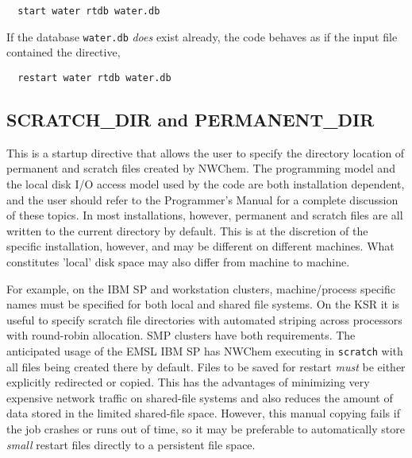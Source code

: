 \begin{verbatim}
  start water rtdb water.db
\end{verbatim}

If the database \verb+water.db+ {\it does} exist already,
the code behaves as if the input file contained the directive,

\begin{verbatim}
  restart water rtdb water.db
\end{verbatim}


\subsection{SCRATCH\_DIR and PERMANENT\_DIR}
\label{sec:dirs}


This is a startup directive that allows the user to specify the directory
location of permanent and scratch files created by NWChem.  The programming
model and the local disk I/O access model used by the code are both installation
dependent, and the user should refer to the Programmer's Manual for a
complete discussion of these topics.  
In most installations, however, permanent and scratch files are all 
written to the current directory by default.  This is at the discretion
of the specific installation, however, and may be different on different
machines.  What constitutes 'local' disk space may also differ from
machine to machine.


For example, on the IBM SP and workstation clusters, machine/process 
specific names 
must be specified for both local and shared file systems.
On the KSR it is useful to specify scratch file directories with
automated striping across processors with round-robin allocation.  SMP
clusters have both requirements.  The anticipated usage of the EMSL
IBM SP has NWChem executing in \verb+scratch+ with all files
being created there by default.  Files to be saved for restart 
{\em must} be either explicitly redirected or copied.  This has the
advantages of minimizing very expensive network traffic on shared-file
systems and also reduces the amount of data stored in the limited
shared-file space.  However, this manual copying fails if the job crashes or
runs out of time, so it may be preferable to automatically store
{\em small} restart files directly to a persistent file space.

